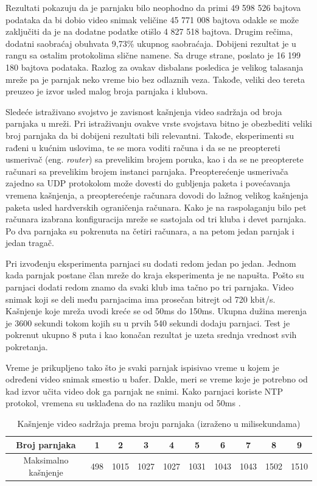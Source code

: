\documentclass[12pt,oneside]{memoir}
\begin{document}
Rezultati pokazuju da je parnjaku bilo neophodno da primi 49 598 526 bajtova podataka da bi dobio video snimak veličine 45 771 008 bajtova odakle se može zaključiti da je na dodatne podatke otišlo 4 827 518 bajtova. Drugim rečima, dodatni saobraćaj obuhvata 9,73\% ukupnog saobraćaja. Dobijeni rezultat je u rangu sa ostalim protokolima slične namene. Sa druge strane, poslato je 16 199 180 bajtova podataka. Razlog za ovakav disbalans posledica je velikog talasanja mreže pa je parnjak neko vreme bio bez odlaznih veza. Takođe, veliki deo tereta preuzeo je izvor usled malog broja parnjaka i klubova. 

Sledeće istraživano svojstvo je zavisnost kašnjenja video sadržaja od broja parnjaka u mreži. Pri istraživanju ovakve vrste svojstava bitno je obezbediti veliki broj parnjaka da bi dobijeni rezultati bili relevantni. Takođe, eksperimenti su rađeni u kućnim uslovima, te se mora voditi računa i da se ne preoptereti usmerivač (eng. \textit{router}) sa prevelikim brojem poruka, kao i da se ne preopterete računari sa prevelikim brojem instanci parnjaka. Preopterećenje usmerivača zajedno sa UDP protokolom može dovesti do gubljenja paketa i povećavanja vremena kašnjenja, a preopterećenje računara dovodi do lažnog velikog kašnjenja paketa usled hardverskih ograničenja računara. Kako je na raspolaganju bilo pet računara izabrana konfiguracija mreže se sastojala od tri kluba i devet parnjaka. Po dva parnjaka su pokrenuta na četiri računara, a na petom jedan parnjak i jedan tragač.

Pri izvođenju eksperimenta parnjaci su dodati redom jedan po jedan. Jednom kada parnjak postane član mreže do kraja eksperimenta je ne napušta. Pošto su parnjaci dodati redom znamo da svaki klub ima tačno po tri parnjaka. Video snimak koji se deli među parnjacima ima prosečan bitrejt od 720 kbit/s. Kašnjenje koje mreža uvodi kreće se od 50ms do 150ms. Ukupna dužina merenja je 3600 sekundi tokom kojih su u prvih 540 sekundi dodaju parnjaci. Test je pokrenut ukupno 8 puta i kao konačan rezultat je uzeta srednja vrednost svih pokretanja. 

Vreme je prikupljeno tako što je svaki parnjak ispisivao vreme u kojem je određeni video snimak smestio u bafer. Dakle, meri se vreme koje je potrebno od kad izvor učita video dok ga parnjak ne snimi. Kako parnjaci koriste NTP protokol, vremena su usklađena do na razliku manju od 50ms \cite{Magee}. 


\begin{table}[h]
\caption{Kašnjenje video sadržaja prema broju parnjaka (izraženo u milisekundama)} 
\label{tab:kasnjenje}
\centering
\begin{tabular}{ |c|c|c|c|c|c|c|c|c|c| } 
\hline 
 Broj parnjaka & 1 & 2 & 3 & 4 & 5 & 6 & 7 & 8 & 9 \\
\hline
 Maksimalno kašnjenje & 498 & 1015 & 1027 & 1027 & 1031 & 1043 & 1043 & 1502 & 1510  \\
\hline
\end{tabular}
\end{table}
\end{document}
